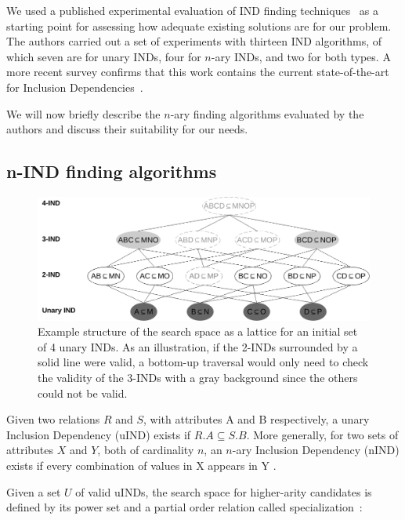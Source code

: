 We used a published experimental evaluation of \gls{IND} finding techniques~\cite{Dursch2019} as a starting point for
assessing how adequate existing solutions are for our problem. The authors carried out a
set of experiments with thirteen \gls{IND} algorithms, of which seven are for unary \glspl{IND},
four for $n$-ary \glspl{IND}, and two for both types. A more recent survey confirms that this
work contains the current state-of-the-art for Inclusion
Dependencies~\cite{kossmann_data_2022}.

We will now briefly describe the $n$-ary finding
algorithms evaluated by the authors and discuss their suitability for our needs.

\subsection{n-IND finding algorithms}
\label{sec:nind_finding}
\begin{figure}[ht]
    \centering
    \includegraphics[width=\linewidth]{images/5_presq/lattice}
    \caption[Example structure of the search space as a lattice for an initial set
        of 4 unary .]{
        Example structure of the search space as a lattice for an initial set
        of 4 unary \glspl{IND}.
        As an illustration, if the 2-INDs surrounded by a solid line were valid,
        a bottom-up traversal would only need to check the validity of the 3-INDs with a 
        gray background since the others could not be valid.
    }
    \label{fig:lattice}
\end{figure}

Given two relations $R$ and $S$, with attributes A and B respectively,
a unary Inclusion Dependency (uIND) exists if $R.A \subseteq S.B$.
More generally, for two sets of attributes $X$ and $Y$, both of cardinality $n$, an
$n$-ary Inclusion Dependency (nIND) exists if every combination of values in X appears in Y
\cite{DeMarchi2002,abedjan2015}.

Given a set $U$ of valid uINDs, the search space for
higher-arity candidates is defined by its power set and a partial order relation
called specialization~\cite{DeMarchi2002}:

